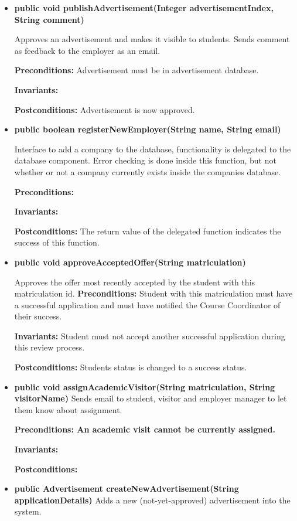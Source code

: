 \documentclass[11pt]{l3deliverable}
\begin{document}
\begin{itemize}

\item{\textbf{public void publishAdvertisement(Integer
    advertisementIndex, String comment)}

Approves an advertisement and makes it visible to students. Sends
comment as feedback to the employer as an email.

\textbf{Preconditions:} Advertisement must be in advertisement database.

\textbf{Invariants:}

\textbf{Postconditions:} Advertisement is now approved.}
\item{\textbf{public boolean registerNewEmployer(String name, String email)} 

Interface to add a company to the database, functionality is delegated to the
database component.
Error checking is done inside this function, but not whether or not a company
currently exists inside the companies database.

\textbf{Preconditions:} 

\textbf{Invariants:}

\textbf{Postconditions:} The return value of the delegated function indicates
the success of this function.}
\item{\textbf{public void approveAcceptedOffer(String matriculation)}

Approves the offer most recently accepted by the student with this matriculation
id. 
\textbf{Preconditions:} Student with this matriculation must have a successful
application and must have notified the Course Coordinator of their success.

\textbf{Invariants:} Student must not accept another successful application
during this review process.

\textbf{Postconditions:} Students status is changed to a success status.}
\item{\textbf{public void assignAcademicVisitor(String matriculation, String
    visitorName)}
Sends email to student, visitor and employer manager to let them know about
assignment. 

\textbf{Preconditions: An academic visit cannot be currently assigned.}

\textbf{Invariants:} 

\textbf{Postconditions:} }
\item{\textbf{public Advertisement createNewAdvertisement(String
    applicationDetails)}
Adds a new (not-yet-approved) advertisement into the system.

}
\end{itemize}
\end{document}

